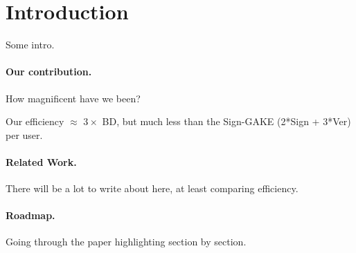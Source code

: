 \section{Introduction}\label{sec:introduction}
Some intro.

\paragraph{Our contribution.}
How magnificent have we been?

Our efficiency $\approx$ $3\times $ BD, but much less than the Sign-GAKE (2*Sign + 3*Ver) per user.

\paragraph{Related Work.}
There will be a lot to write about here, at least comparing efficiency.

\paragraph{Roadmap.}
Going through the paper highlighting section by section.

